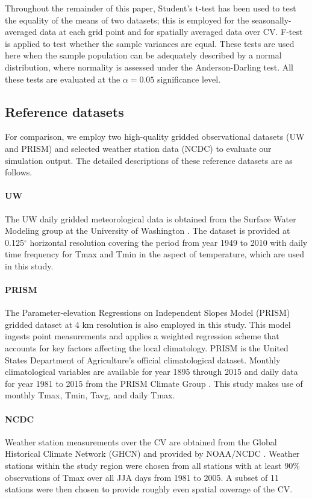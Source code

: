 \documentclass[draft,ms]{agutex}   %
\begin{document}
\begin{article}
Throughout the remainder of this paper, Student's t-test has been used to test the equality of the means of two datasets; this is employed for the seasonally-averaged data at each grid point and for spatially averaged data over CV. F-test is applied to test whether the sample variances are equal. These tests are used here when the sample population can be adequately described by a normal distribution, where normality is assessed under the Anderson-Darling test. All these tests are evaluated at the $\alpha = 0.05$ significance level. 

\subsection{Reference datasets}

For comparison, we employ two high-quality gridded observational datasets (UW and PRISM) and selected weather station data (NCDC) to evaluate our simulation output. The detailed descriptions of these reference datasets are as follows.

\paragraph{UW} The UW daily gridded meteorological data is obtained from the Surface Water Modeling group at the University of Washington \citep{maurer2002long, hamlet2005production}. The dataset is provided at 0.125$^\circ$ horizontal resolution covering the period from year 1949 to 2010 with daily time frequency for Tmax and Tmin in the aspect of temperature, which are used in this study.

\paragraph{PRISM} The Parameter-elevation Regressions on Independent Slopes Model (PRISM) \citep{daly2008physiographically} gridded dataset at 4 km resolution is also employed in this study.  This model ingests point measurements and applies a weighted regression scheme that accounts for key factors affecting the local climatology. PRISM is the United States Department of Agriculture's official climatological dataset. Monthly climatological variables are available for year 1895 through 2015 and daily data for year 1981 to 2015 from the PRISM Climate Group \citep{prismSource}. This study makes use of monthly Tmax, Tmin, Tavg, and daily Tmax.

\paragraph{NCDC} Weather station measurements over the CV are obtained from the Global Historical Climate Network (GHCN) and provided by NOAA/NCDC \citep{menne2012overview}. Weather stations within the study region were chosen from all stations with at least 90$\%$ observations of Tmax over all JJA days from 1981 to 2005.  A subset of 11 stations were then chosen to provide roughly even spatial coverage of the CV.


\end{article}
\end{document}
